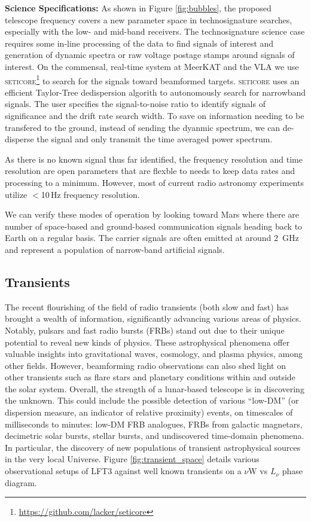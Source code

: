 \textbf{Science Specifications:} As shown in Figure \ref{fig:bubbles}, the proposed telescope frequency covers a new parameter space in technosignature searches, especially with the low- and mid-band receivers. The technosignature science case requires some in-line processing of the data to find signals of interest and generation of dynamic spectra or raw voltage postage stamps around signals of interest. On the commensal, real-time system at MeerKAT and the VLA \citep{Tremblay_2024} we use \textsc{seticore}\footnote{\url{https://github.com/lacker/seticore}} to search for the signals toward beamformed targets. \textsc{seticore} uses an efficient Taylor-Tree dedispersion algorith to autonomously search for narrowband signals. The user specifies the signal-to-noise ratio to identify signals of significance and the drift rate search width. To save on information needing to be transfered to the ground, instead of sending the dyanmic spectrum, we can de-disperse the signal and only transmit the time averaged power spectrum. 

As there is no known signal thus far identified, the frequency resolution and time resolution are open parameters that are flexble to needs to keep data rates and processing to a minimum. However, most of current radio astronomy experiments utilize $<$10\,Hz frequency resolution. 

We can verify these modes of operation by looking toward Mars where there are number of space-based and ground-based communication signals heading back to Earth on a regular basis. The carrier signals are often emitted at around 2~GHz and represent a population of narrow-band artificial signals.

\subsection{Transients}
The recent flourishing of the field of radio transients (both slow and fast) has brought a wealth of information, significantly advancing various areas of physics. Notably, pulsars and fast radio bursts (FRBs) stand out due to their unique potential to reveal new kinds of physics. These astrophysical phenomena offer valuable insights into gravitational waves, cosmology, and plasma physics, among other fields. However, beamforming radio observations can also shed light on other transients such as flare stars and planetary conditions within and outside the solar system. Overall, the strength of a lunar-based telescope is in discovering the unknown. This could include the possible detection of various “low-DM” (or dispersion measure, an indicator of relative proximity) events, on timescales of milliseconds to minutes: low-DM FRB analogues, FRBs from galactic magnetars, decimetric solar bursts, stellar bursts, and undiscovered time-domain phenomena. In particular, the discovery of new populations of transient astrophysical sources in the very local Universe. Figure \ref{fig:transient_space} details various observational setups of LFT3 against well known transients on a $\nu \text{W}$ vs $L_\nu$ phase diagram. 

